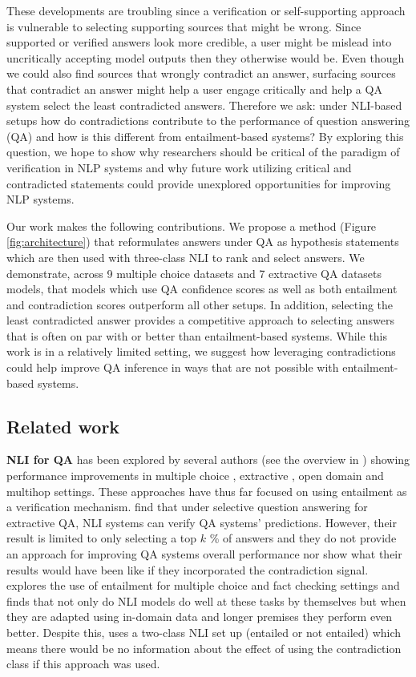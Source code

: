 \documentclass[11pt]{article}
\begin{document}
These developments are troubling since a verification or self-supporting approach is vulnerable to selecting supporting sources that might be wrong. Since supported or verified answers look more credible, a user might be mislead into uncritically accepting model outputs then they otherwise would be. Even though we could also find sources that wrongly contradict an answer, surfacing sources that contradict an answer might help a user engage critically and help a QA system select the least contradicted answers. Therefore we ask: under NLI-based setups how do contradictions contribute to the performance of question answering (QA) and how is this different from entailment-based systems? By exploring this question, we hope to show why researchers should be critical of the paradigm of verification in NLP systems and why future work utilizing critical and contradicted statements could provide unexplored opportunities for improving NLP systems.

Our work makes the following contributions. We propose a method (Figure \ref{fig:architecture}) that reformulates answers under QA as hypothesis statements which are then used with three-class NLI to rank and select answers. We demonstrate, across 9 multiple choice datasets and 7 extractive QA datasets models, that models which use QA confidence scores as well as both entailment and contradiction scores outperform all other setups. In addition, selecting the least contradicted answer provides a competitive approach to selecting answers that is often on par with or better than entailment-based systems. While this work is in a relatively limited setting, we suggest how leveraging contradictions could help improve QA inference in ways that are not possible with entailment-based systems.
\subsection{Related work}
\textbf{NLI for QA} has been explored by several authors (see the overview in \citet{paramasivam_survey_2021}) showing performance improvements in multiple choice \citep{mishra_looking_2021}, extractive \citep{chen_can_2021}, open domain \citep{harabagiu_methods_2006} and multihop \citep{trivedi_repurposing_2019} settings. These approaches have thus far focused on using entailment as a verification mechanism. \citet{chen_can_2021} find that under selective question answering \citep{kamath_selective_2020} for extractive QA, NLI systems can verify QA systems’ predictions. However, their result is limited to only selecting a top $k$ \% of answers and they do not provide an approach for improving QA systems overall performance nor show what their results would have been like if they incorporated the contradiction signal. \citet{mishra_looking_2021} explores the use of entailment for multiple choice and fact checking settings and finds that not only do NLI models do well at these tasks by themselves but when they are adapted using in-domain data and longer premises they perform even better. Despite this, \citet{mishra_looking_2021} uses a two-class NLI set up (entailed or not entailed) which means there would be no information about the effect of using the contradiction class if this approach was used.
\end{document}
